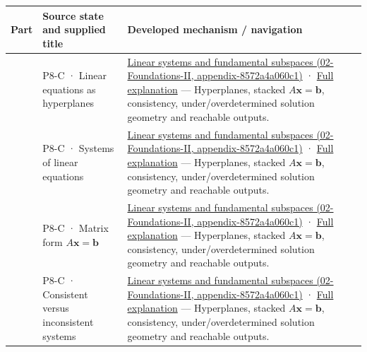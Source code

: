 {\def\LTcaptype{none} %
\begin{longtable}[]{@{}
  >{\raggedright\arraybackslash}p{}
  >{\raggedright\arraybackslash}p{}
  >{\raggedright\arraybackslash}p{}@{}}
\toprule\noalign{}
\begin{minipage}[b]{\linewidth}\raggedright
Part
\end{minipage} & \begin{minipage}[b]{\linewidth}\raggedright
Source state and supplied title
\end{minipage} & \begin{minipage}[b]{\linewidth}\raggedright
Developed mechanism / navigation
\end{minipage} \\
\midrule\noalign{}
\endhead
\bottomrule\noalign{}
\endlastfoot
701 & P8-C · Linear equations as hyperplanes & \href{}{Linear systems and fundamental subspaces (02-Foundations-II, appendix-8572a4a060c1)} · \href{Continuous\%20Notes/Computing\%20Foundations\%20-\%20From\%20Bits\%20to\%20C++\%20and\%20Systems\%20APIs\#A\%20system\%20is\%20an\%20intersection\%20of\%20constraints/}{Full explanation} --- Hyperplanes, stacked \(A\mathbf x=\mathbf b\), consistency, under/overdetermined solution geometry and reachable outputs. \\
702 & P8-C · Systems of linear equations & \href{}{Linear systems and fundamental subspaces (02-Foundations-II, appendix-8572a4a060c1)} · \href{Continuous\%20Notes/Computing\%20Foundations\%20-\%20From\%20Bits\%20to\%20C++\%20and\%20Systems\%20APIs\#A\%20system\%20is\%20an\%20intersection\%20of\%20constraints/}{Full explanation} --- Hyperplanes, stacked \(A\mathbf x=\mathbf b\), consistency, under/overdetermined solution geometry and reachable outputs. \\
703 & P8-C · Matrix form \(A\mathbf x=\mathbf b\) & \href{}{Linear systems and fundamental subspaces (02-Foundations-II, appendix-8572a4a060c1)} · \href{Continuous\%20Notes/Computing\%20Foundations\%20-\%20From\%20Bits\%20to\%20C++\%20and\%20Systems\%20APIs\#A\%20system\%20is\%20an\%20intersection\%20of\%20constraints/}{Full explanation} --- Hyperplanes, stacked \(A\mathbf x=\mathbf b\), consistency, under/overdetermined solution geometry and reachable outputs. \\
704 & P8-C · Consistent versus inconsistent systems & \href{}{Linear systems and fundamental subspaces (02-Foundations-II, appendix-8572a4a060c1)} · \href{Continuous\%20Notes/Computing\%20Foundations\%20-\%20From\%20Bits\%20to\%20C++\%20and\%20Systems\%20APIs\#A\%20system\%20is\%20an\%20intersection\%20of\%20constraints/}{Full explanation} --- Hyperplanes, stacked \(A\mathbf x=\mathbf b\), consistency, under/overdetermined solution geometry and reachable outputs. \\

\end{longtable}}
